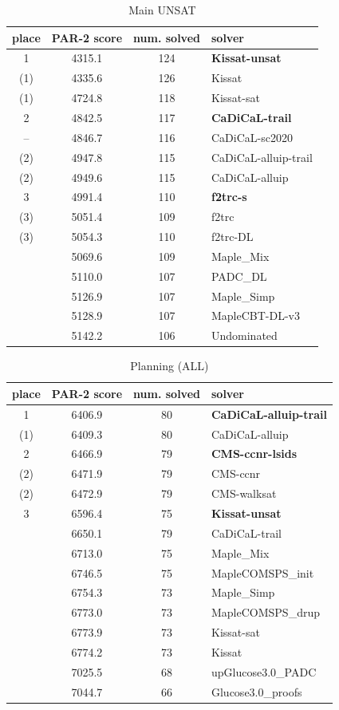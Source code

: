 \documentclass{elsarticle}
\begin{document}
\begin{table}
\caption{Main UNSAT}
\label{tab:mainUNSAT}
\begin{tabular}{cccl}
place & PAR-2 score & num. solved & solver \\
\hline   
1     & 4315.1 & 124 & {\bf Kissat-unsat} \\
(1)   & 4335.6 & 126 & Kissat \\
(1)   & 4724.8 & 118 & Kissat-sat \\
 2    & 4842.5 & 117 & {\bf CaDiCaL-trail} \\
--    & 4846.7 & 116 & CaDiCaL-sc2020 \\
(2)   & 4947.8 & 115 & CaDiCaL-alluip-trail \\
(2)   & 4949.6 & 115 & CaDiCaL-alluip \\
 3    & 4991.4 & 110 & {\bf f2trc-s} \\
(3)   & 5051.4 & 109 & f2trc \\
(3)   & 5054.3 & 110 & f2trc-DL \\
      & 5069.6 & 109 & Maple\_Mix \\
      & 5110.0 & 107 & PADC\_DL \\
      & 5126.9 & 107 & Maple\_Simp \\
      & 5128.9 & 107 & MapleCBT-DL-v3 \\
      & 5142.2 & 106 & Undominated \\      
\end{tabular}
\end{table}


\begin{table}
\caption{Planning (ALL)}
\label{tab:planning}
\begin{tabular}{cccl}
place & PAR-2 score & num. solved & solver \\
\hline   
 1    & 6406.9 & 80 & {\bf CaDiCaL-alluip-trail} \\
(1)   & 6409.3 & 80 & CaDiCaL-alluip \\
 2    & 6466.9 & 79 & {\bf CMS-ccnr-lsids} \\
(2)   & 6471.9 & 79 & CMS-ccnr \\
(2)   & 6472.9 & 79 & CMS-walksat \\
 3    & 6596.4 & 75 & {\bf Kissat-unsat} \\
      & 6650.1 & 79 & CaDiCaL-trail \\
      & 6713.0 & 75 & Maple\_Mix \\
      & 6746.5 & 75 & MapleCOMSPS\_init \\
      & 6754.3 & 73 & Maple\_Simp \\
      & 6773.0 & 73 & MapleCOMSPS\_drup \\
      & 6773.9 & 73 & Kissat-sat \\
      & 6774.2 & 73 & Kissat \\
      & 7025.5 & 68 & upGlucose3.0\_PADC \\
      & 7044.7 & 66 & Glucose3.0\_proofs \\
\end{tabular}
\end{table}
\end{document}
